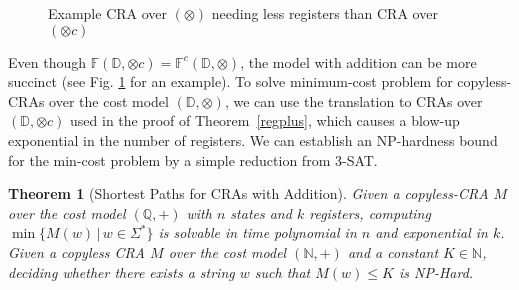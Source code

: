 \documentclass[11pt]{article}
\newtheorem{theorem}{Theorem}
\newcommand{\domain}{\ensuremath{\mathbb{D}}}
\newcommand{\Nat}{\ensuremath{\mathbb{N}}}
\newcommand{\Rat}{\ensuremath{\mathbb{Q}}}
\newcommand{\CF}{{\mathbb F}}
\newcommand{\CCF}{{\mathbb F}^c}
\newcommand{\sep}{\ensuremath{\,|\,}}
\newcommand{\fm}[1]{\ensuremath{#1^{*}}}
\newcommand{\nphard}{{\sc\textsc NP}-{\sc\textsc Hard}\xspace}
\newcommand{\edwa}{\ensuremath{M}}
\def\myplus{\otimes}
\begin{document}
\begin{figure}[t]
\caption{Example CRA over $(\myplus)$ needing less registers than CRA
over $(\myplus c)$\label{succint}}
\end{figure}



Even though $\CF(\domain,\myplus c)=\CCF(\domain,\myplus)$, the model
with addition can be more succinct (see Fig. \ref{succint} for an
example).  To solve minimum-cost problem for copyless-CRAs over  the
cost model $(\domain,\myplus )$, we can use the translation to CRAs
over $(\domain,\myplus c)$ used in the proof of Theorem~\ref{regplus},
which causes a blow-up exponential in the number of registers. We can
establish an NP-hardness bound for the min-cost problem by a simple
reduction from 3-SAT.

\begin{theorem}[Shortest Paths for CRAs with Addition]\label{ppCEDWAmcp}
Given a copyless-CRA $\edwa$ over the cost model $(\Rat,+)$ with $n$
states and $k$ registers, computing $\min\{\edwa(w)\sep
w\in\fm\Sigma\}$ is solvable in time polynomial in $n$ and exponential
in $k$.  Given a copyless CRA $\edwa$ over the cost model $(\Nat,+)$ and a
constant $K\in\Nat$, deciding whether there exists a string $w$ such
that $\edwa(w)\leq K$ is \nphard.
\end{theorem}
\end{document}
